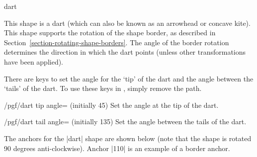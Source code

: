 \begin{shape}{dart}


	This shape is a dart (which can also be known as an arrowhead or
	concave kite). This shape supports the rotation of the shape border, 
	as described in Section~\ref{section-rotating-shape-borders}. 
	The angle of the border rotation determines the direction in which 
	the dart points (unless other transformations have been applied).
	
	There are \pgfname{} keys to set the 
	angle for the `tip' of the dart and the angle between the `tails'
	of the dart. 
	To use these keys in \tikzname, simply remove the  
	path.

\begin{codeexample}[]
\end{codeexample}

	\begin{key}{/pgf/dart tip angle= (initially 45)}
		Set the angle at the tip of the dart.
	\end{key}
	
	\begin{key}{/pgf/dart tail angle= (initially 135)}
		Set the angle between the tails of the dart.
	\end{key}
		
	The anchors for the |dart| shape are shown below (note that the 
	shape is rotated 90 degrees anti-clockwise). Anchor |110| is an 
	example of a border anchor.
\begin{codeexample}[]
\Huge
{}
\end{codeexample}
\end{shape}




